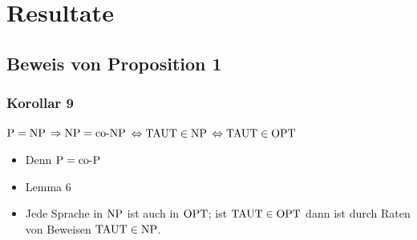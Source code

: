 \section{Resultate} 
\subsection{Beweis von Proposition 1}

\begin{frame}
  \frametitle{Korollar 9}
  \(\text{P} = \text{NP}\) 
   \(\Rightarrow \text{NP} = \text{co-NP}\) 
   \(\Leftrightarrow \text{TAUT} \in \text{NP}\) 
   \(\Leftrightarrow \text{TAUT} \in \text{OPT}\)
  
  \begin{itemize}
   \item<2> Denn \(\text{P} = \text{co-P}\)
   \item<3> Lemma 6
   \item<4-5>  Jede Sprache in \(\text{NP}\) ist auch in \(\text{OPT}\);  ist \(\text{TAUT} \in \text{OPT}\) dann ist durch Raten von Beweisen \(\text{TAUT} \in \text{NP}\).
  \end{itemize}
\end{frame}
